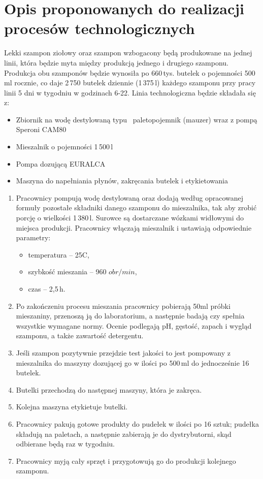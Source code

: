 \section{Opis proponowanych do realizacji procesów technologicznych}

Lekki szampon ziołowy oraz szampon wzbogacony będą produkowane na jednej linii, która będzie myta między produkcją jednego i drugiego szamponu. Produkcja obu szamponów będzie wynosiła po 660\,tys. butelek o pojemności 500\,ml rocznie, co daje 2\,750 butelek dziennie (1\,375\,l) każdego szamponu przy pracy linii 5 dni w tygodniu w godzinach 6-22. Linia technologiczna będzie składała się z:
\begin{itemize}
	\item Zbiornik na wodę destylowaną typu  paletopojemnik (mauzer) wraz z pompą \textsf{Speroni CAM80}  
	\item Mieszalnik o pojemności 1\,500\,l
	\item Pompa dozującą \textsf{EURALCA}
	\item Maszyna do napełniania płynów, zakręcania butelek i etykietowania
\end{itemize}\vspace{\baselineskip}

\begin{enumerate}
	\item Pracownicy pompują wodę destylowaną oraz dodają według opracowanej formuły pozostałe składniki danego szamponu do mieszalnika, tak aby zrobić porcję o wielkości 1\,380\,l. Surowce są dostarczane wózkami widłowymi do miejsca produkcji. Pracownicy  włączają mieszalnik i ustawiają odpowiednie parametry:
	\begin{itemize}
		\item temperatura – 25\degree C,
		\item szybkość mieszania – 960 $obr/min$,
		\item czas – 2,5\,h.
	\end{itemize}
	\item Po zakończeniu procesu mieszania pracownicy pobierają 50ml próbki mieszaniny, przenoszą ją do laboratorium, a następnie badają czy spełnia wszystkie wymagane normy. Ocenie podlegają pH, gęstość, zapach i wygląd szamponu, a także zawartość detergentu.
	\item Jeśli szampon pozytywnie przejdzie test jakości to jest pompowany z mieszalnika do maszyny dozującej go w ilości po 500\,ml do jednocześnie 16 butelek.
	\item Butelki przechodzą do następnej maszyny, która je zakręca.
	\item Kolejna maszyna etykietuje butelki. 
	\item Pracownicy pakują gotowe produkty do pudełek w ilości po 16 sztuk; pudełka składują na paletach, a następnie zabierają je do dystrybutorni, skąd odbierane będą raz w tygodniu.
	\item Pracownicy myją cały sprzęt i przygotowują go do produkcji kolejnego szamponu. 
\end{enumerate}\vspace{\baselineskip}

